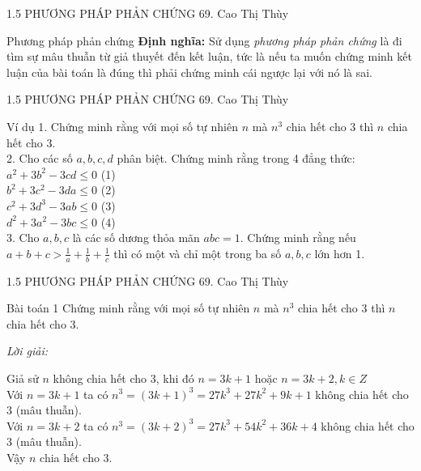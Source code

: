 \begin{frame}{1.5 PHƯƠNG PHÁP PHẢN CHỨNG \hspace{3cm}  69. Cao Thị Thùy} 
\begin{block}{Phương pháp phản chứng}
\textbf{Định nghĩa:}  Sử dụng \textit{phương pháp phản chứng} là đi tìm sự mâu thuẫn từ giả thuyết đến kết luận, tức là nếu ta muốn chứng minh kết luận của bài toán là đúng thì phải chứng minh cái ngược lại với nó là sai.
    
\end{block} 
\end{frame} 
\begin{frame}{1.5 PHƯƠNG PHÁP PHẢN CHỨNG \hspace{3cm}  69. Cao Thị Thùy} 
\begin{block}{Ví dụ}
1. Chứng minh rằng với mọi số tự nhiên $n$ mà $n^3$ chia hết cho 3 thì $n$ chia hết cho 3.\\
2. Cho các số $a,b,c,d$ phân biệt. Chứng minh rằng trong 4 đẳng thức:\\ $a^2+3b^2-3cd\leqslant 0$  (1) \\$b^2+3c^2-3da \leqslant 0$  (2) \\ $c^2+3d^3-3ab\leqslant 0$  (3) \\$d^2+3a^2-3bc\leqslant 0$   (4) \\
3. Cho $a,b,c$ là các số dương thỏa mãn $abc=1$. Chứng minh rằng nếu $a+b+c> \frac{1}{a}+\frac{1}{b}+\frac{1}{c}$ thì có một và chỉ một trong ba số $a,b,c$ lớn hơn 1.
\end{block} 
\end{frame} 
\begin{frame}{1.5 PHƯƠNG PHÁP PHẢN CHỨNG \hspace{3cm}  69. Cao Thị Thùy} 
\begin{block}{Bài toán 1}
Chứng minh rằng với mọi số tự nhiên $n$ mà $n^3$ chia hết cho 3 thì $n$ chia hết cho 3.
\end{block}
\begin{center}
    \textit{Lời giải:}
\end{center}
\begin{block}{}
    Giả sử $n$ không chia hết cho 3, khi đó $n=3k+1$ hoặc $n=3k+2, k \in Z$ \\
    Với $n=3k+1$ ta có $n^3=(3k+1)^3=27k^3+27k^2+9k+1$ không chia hết cho 3 (mâu thuẫn).\\
    Với  $n=3k+2$ ta có $n^3=(3k+2)^3=27k^3+54k^2+36k+4$ không chia hết cho 3 (mâu thuẫn).\\
    Vậy $n$ chia hết cho 3.
\end{block} 
\end{frame}
